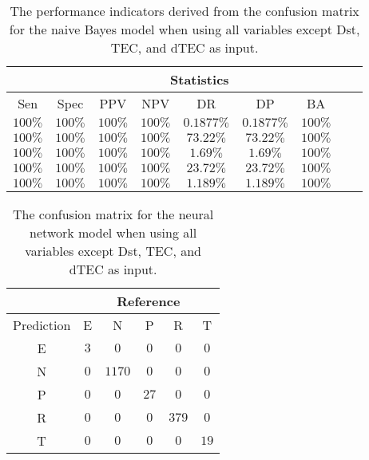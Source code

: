 \begin{table}[!ht]
	\centering
	\begin{tabular}{|c|c|c|c|c|c|c|c|c|}
		\hline
		 & \multicolumn{7}{c|}{Statistics} \\ \hline
		Sen & Spec & PPV & NPV & DR & DP & BA \\ \hline
		$100\%$ & $100\%$ & $100\%$ & $100\%$ & $0.1877\%$ & $0.1877\%$ & $100\%$ \\ \hline
		$100\%$ & $100\%$ & $100\%$ & $100\%$ & $73.22\%$ & $73.22\%$ & $100\%$ \\ \hline
		$100\%$ & $100\%$ & $100\%$ & $100\%$ & $1.69\%$ & $1.69\%$ & $100\%$ \\ \hline
		$100\%$ & $100\%$ & $100\%$ & $100\%$ & $23.72\%$ & $23.72\%$ & $100\%$ \\ \hline
		$100\%$ & $100\%$ & $100\%$ & $100\%$ & $1.189\%$ & $1.189\%$ & $100\%$ \\ \hline
	\end{tabular}
	\caption{The performance indicators derived from the confusion matrix for the naive Bayes model when using all variables except Dst, TEC, and dTEC as input.}
	\label{tab:cs:noTEC:nb}
\end{table}

\begin{table}[!ht]
	\centering
	\begin{tabular}{|c|c|c|c|c|c|}
		\hline
		 & \multicolumn{5}{|c|}{Reference} \\ \hline
		 Prediction & E & N & P & R & T \\ \hline
		 E & $3$ & $0$ & $0$ & $0$ & $0$ \\ \hline
		 N & $0$ & $1170$ & $0$ & $0$ & $0$ \\ \hline
		 P & $0$ & $0$ & $27$ & $0$ & $0$ \\ \hline
		 R & $0$ & $0$ & $0$ & $379$ & $0$ \\ \hline
		 T & $0$ & $0$ & $0$ & $0$ & $19$ \\ \hline
	\end{tabular}
	\caption{The confusion matrix for the neural network model when using all variables except Dst, TEC, and dTEC as input.}
	\label{tab:cm:noTEC:nnet}
\end{table}

